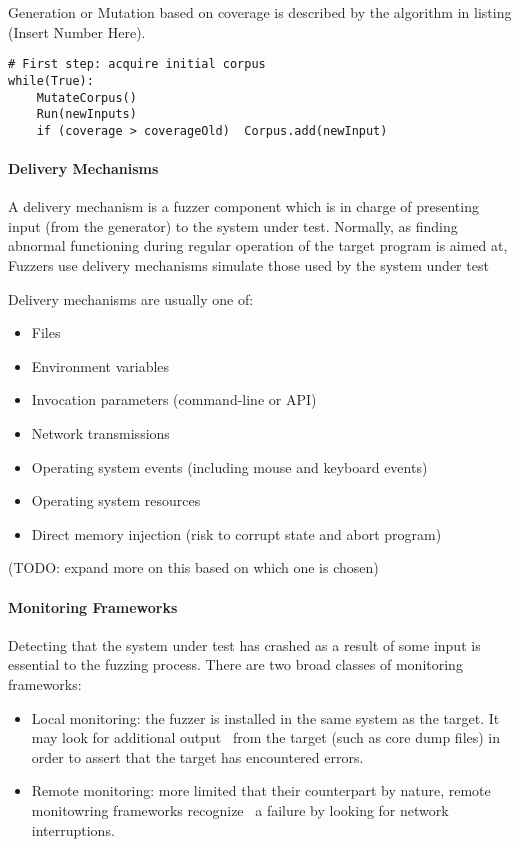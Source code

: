 Generation or Mutation based on coverage is described by the algorithm in listing (Insert Number Here). 

\begin{lstlisting}
# First step: acquire initial corpus
while(True):
    MutateCorpus()
    Run(newInputs)
    if (coverage > coverageOld)  Corpus.add(newInput)
\end{lstlisting}


\paragraph{Delivery Mechanisms}

A delivery mechanism is a fuzzer component which is in charge of presenting input (from the generator) 
to the system under test. Normally, as finding abnormal functioning during regular operation of the
target program is aimed at, Fuzzers use delivery mechanisms simulate those used by the system under test \cite{mcnally12}

Delivery mechanisms are usually one of:

\begin{itemize}
    \item Files
    \item Environment variables
    \item Invocation parameters (command-line or API)
    \item Network transmissions
    \item Operating system events (including mouse and keyboard events)
    \item Operating system resources 
    \item Direct memory injection (risk to corrupt state and abort program)
\end{itemize}

(TODO: expand more on this based on which one is chosen)

\paragraph{Monitoring Frameworks}

Detecting that the system under test has crashed as a result of some input is essential to the fuzzing process.
There are two broad classes of monitoring frameworks\cite{mcnally12}:

\begin{itemize}
    \item Local monitoring: the fuzzer is installed in the same system as the target. It may look for additional output \
    from the target (such as core dump files) in order to assert that the target has encountered errors.
    \item Remote monitoring: more limited that their counterpart by nature, remote monitowring frameworks recognize \
    a failure by looking for network interruptions.
\end{itemize}

